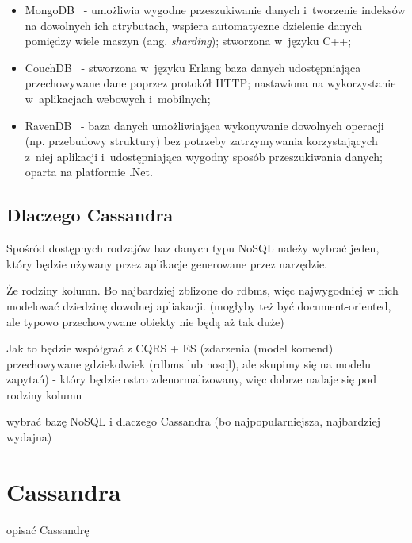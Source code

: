\begin{itemize}
 \item MongoDB~\cite{mongo_db} - umożliwia wygodne przeszukiwanie danych i~tworzenie indeksów na dowolnych ich atrybutach, wspiera automatyczne dzielenie danych pomiędzy wiele maszyn (ang. \emph{sharding}); stworzona w~języku C++;
 \item CouchDB~\cite{couch_db} - stworzona w~języku Erlang baza danych udostępniająca przechowywane dane poprzez protokół HTTP; nastawiona na wykorzystanie w~aplikacjach webowych i~mobilnych;
 \item RavenDB~\cite{raven_db} - baza danych umożliwiająca wykonywanie dowolnych operacji (np. przebudowy struktury) bez potrzeby zatrzymywania korzystających z~niej aplikacji i~udostępniająca wygodny sposób przeszukiwania danych; oparta na platformie .Net.
\end{itemize}


\subsection{Dlaczego Cassandra}

Spośród dostępnych rodzajów baz danych typu NoSQL należy wybrać jeden, który będzie używany przez aplikacje generowane przez narzędzie.


Że rodziny kolumn.
Bo najbardziej zblizone do rdbms, więc najwygodniej w nich modelować dziedzinę dowolnej apliakacji.
(mogłyby też być document-oriented, ale typowo przechowywane obiekty nie będą aż tak duże)

Jak to będzie współgrać z CQRS + ES (zdarzenia (model komend) przechowywane gdziekolwiek (rdbms lub nosql), ale skupimy się na modelu zapytań) - który będzie ostro zdenormalizowany, więc dobrze nadaje się pod rodziny kolumn

wybrać bazę NoSQL i dlaczego Cassandra (bo najpopularniejsza, najbardziej wydajna)



\section{Cassandra}

opisać Cassandrę
